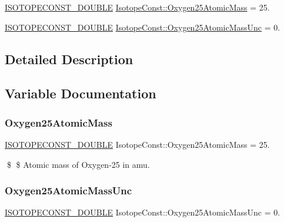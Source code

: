 \begin{DoxyCompactItemize}
\item 
\mbox{\hyperlink{group___isotope_const-_macros_ga8f45a7272ce02c0b4c65c44636ed719a}{I\+S\+O\+T\+O\+P\+E\+C\+O\+N\+S\+T\+\_\+\+D\+O\+U\+B\+LE}} \mbox{\hyperlink{group___isotope_const-_oxygen-_o25_ga29752496f2990fd339ab4e85acbd2e64}{Isotope\+Const\+::\+Oxygen25\+Atomic\+Mass}} = 25.
\item 
\mbox{\hyperlink{group___isotope_const-_macros_ga8f45a7272ce02c0b4c65c44636ed719a}{I\+S\+O\+T\+O\+P\+E\+C\+O\+N\+S\+T\+\_\+\+D\+O\+U\+B\+LE}} \mbox{\hyperlink{group___isotope_const-_oxygen-_o25_ga87af31e44d191e45496ef5d2be9be253}{Isotope\+Const\+::\+Oxygen25\+Atomic\+Mass\+Unc}} = 0.
\end{DoxyCompactItemize}


\subsection{Detailed Description}


\subsection{Variable Documentation}
\mbox{\label{group___isotope_const-_oxygen-_o25_ga29752496f2990fd339ab4e85acbd2e64}} 
\subsubsection{\texorpdfstring{Oxygen25\+Atomic\+Mass}{Oxygen25AtomicMass}}
{\footnotesize\ttfamily \mbox{\hyperlink{group___isotope_const-_macros_ga8f45a7272ce02c0b4c65c44636ed719a}{I\+S\+O\+T\+O\+P\+E\+C\+O\+N\+S\+T\+\_\+\+D\+O\+U\+B\+LE}} Isotope\+Const\+::\+Oxygen25\+Atomic\+Mass = 25.}

\$ \$ Atomic mass of Oxygen-\/25 in amu. \mbox{\label{group___isotope_const-_oxygen-_o25_ga87af31e44d191e45496ef5d2be9be253}} 
\subsubsection{\texorpdfstring{Oxygen25\+Atomic\+Mass\+Unc}{Oxygen25AtomicMassUnc}}
{\footnotesize\ttfamily \mbox{\hyperlink{group___isotope_const-_macros_ga8f45a7272ce02c0b4c65c44636ed719a}{I\+S\+O\+T\+O\+P\+E\+C\+O\+N\+S\+T\+\_\+\+D\+O\+U\+B\+LE}} Isotope\+Const\+::\+Oxygen25\+Atomic\+Mass\+Unc = 0.}

